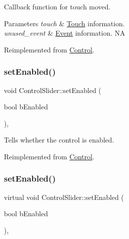 Callback function for touch moved.


\begin{DoxyParams}{Parameters}
{\em touch} & \hyperlink{classTouch}{Touch} information. \\
\hline
{\em unused\+\_\+event} & \hyperlink{classEvent}{Event} information.  NA \\
\hline
\end{DoxyParams}


Reimplemented from \hyperlink{classControl_a26d2e6af053319dc605949678f726622}{Control}.

\mbox{\label{classControlSlider_aeb98aed4fbd48f28c55ac6eb7ffd9b30}} 
\subsubsection{\texorpdfstring{set\+Enabled()}{setEnabled()}\hspace{0.1cm}{\footnotesize\ttfamily [1/2]}}
{\footnotesize\ttfamily void Control\+Slider\+::set\+Enabled (\begin{DoxyParamCaption}\item[{bool}]{b\+Enabled }\end{DoxyParamCaption})\hspace{0.3cm}{\ttfamily [override]}, {\ttfamily [virtual]}}

Tells whether the control is enabled. 

Reimplemented from \hyperlink{classControl_a55339ae920182245d5ec114c33f4b1fd}{Control}.

\mbox{\label{classControlSlider_ad02c5f0f4382a9780f215e3568757c2b}} 
\subsubsection{\texorpdfstring{set\+Enabled()}{setEnabled()}\hspace{0.1cm}{\footnotesize\ttfamily [2/2]}}
{\footnotesize\ttfamily virtual void Control\+Slider\+::set\+Enabled (\begin{DoxyParamCaption}\item[{bool}]{b\+Enabled }\end{DoxyParamCaption})\hspace{0.3cm}{\ttfamily [override]}, {\ttfamily [virtual]}}

